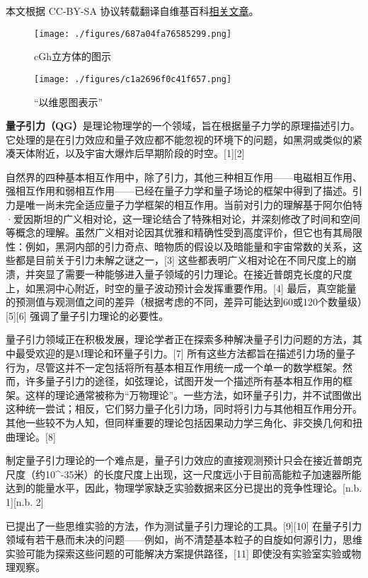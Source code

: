 
本文根据 CC-BY-SA 协议转载翻译自维基百科\href{https://en.wikipedia.org/wiki/Quantum_gravity}{相关文章}。
\begin{figure}[ht]
\centering
\texttt{[image: ./figures/687a04fa76585299.png]}
\caption{cGh立方体的图示} \label{fig_LZYL_1}
\end{figure}
\begin{figure}[ht]
\centering
\texttt{[image: ./figures/c1a2696f0c41f657.png]}
\caption{“以维恩图表示”} \label{fig_LZYL_2}
\end{figure}
\textbf{量子引力（QG）}是理论物理学的一个领域，旨在根据量子力学的原理描述引力。它处理的是在引力效应和量子效应都不能忽视的环境下的问题，如黑洞或类似的紧凑天体附近，以及宇宙大爆炸后早期阶段的时空。[1][2]

自然界的四种基本相互作用中，除了引力，其他三种相互作用——电磁相互作用、强相互作用和弱相互作用——已经在量子力学和量子场论的框架中得到了描述。引力是唯一尚未完全适应量子力学框架的相互作用。当前对引力的理解基于阿尔伯特·爱因斯坦的广义相对论，这一理论结合了特殊相对论，并深刻修改了时间和空间等概念的理解。虽然广义相对论因其优雅和精确性受到高度评价，但它也有其局限性：例如，黑洞内部的引力奇点、暗物质的假设以及暗能量和宇宙常数的关系，这些都是目前关于引力未解之谜之一，[3] 这些都表明广义相对论在不同尺度上的崩溃，并突显了需要一种能够进入量子领域的引力理论。在接近普朗克长度的尺度上，如黑洞中心附近，时空的量子波动预计会发挥重要作用。[4] 最后，真空能量的预测值与观测值之间的差异（根据考虑的不同，差异可能达到60或120个数量级）[5][6] 强调了量子引力理论的必要性。

量子引力领域正在积极发展，理论学者正在探索多种解决量子引力问题的方法，其中最受欢迎的是M理论和环量子引力。[7] 所有这些方法都旨在描述引力场的量子行为，尽管这并不一定包括将所有基本相互作用统一成一个单一的数学框架。然而，许多量子引力的途径，如弦理论，试图开发一个描述所有基本相互作用的框架。这样的理论通常被称为“万物理论”。一些方法，如环量子引力，并不试图做出这种统一尝试；相反，它们努力量子化引力场，同时将引力与其他相互作用分开。其他一些较不为人知，但同样重要的理论包括因果动力学三角化、非交换几何和扭曲理论。[8]

制定量子引力理论的一个难点是，量子引力效应的直接观测预计只会在接近普朗克尺度（约10^-35米）的长度尺度上出现，这一尺度远小于目前高能粒子加速器所能达到的能量水平，因此，物理学家缺乏实验数据来区分已提出的竞争性理论。[n.b. 1][n.b. 2]

已提出了一些思维实验的方法，作为测试量子引力理论的工具。[9][10] 在量子引力领域有若干悬而未决的问题——例如，尚不清楚基本粒子的自旋如何源引力，思维实验可能为探索这些问题的可能解决方案提供路径，[11] 即使没有实验室实验或物理观察。

